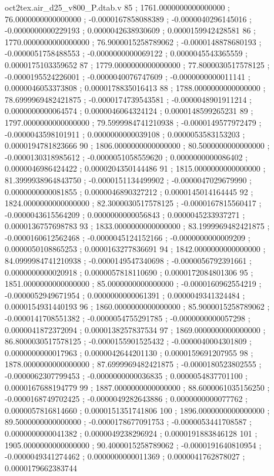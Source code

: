 \begin{filecontents}[overwrite]{oct2tex.air_d25_v800_P.dtab.v}
85 ; 1761.0000000000000000 ; 76.0000000000000000 ; -0.0000167858088389 ; -0.0000040296145016 ; -0.0000000000229193 ; 0.0000042638930609 ; 0.0000159942428581
86 ; 1770.0000000000000000 ; 76.9000015258789062 ; -0.0000148878680193 ; -0.0000051758488553 ; -0.0000000000069122 ; 0.0000045543365559 ; 0.0000175103359652
87 ; 1779.0000000000000000 ; 77.8000030517578125 ; -0.0000195524226001 ; -0.0000040076747609 ; -0.0000000000011141 ; 0.0000046053373808 ; 0.0000178835016413
88 ; 1788.0000000000000000 ; 78.6999969482421875 ; -0.0000174739543581 ; -0.0000048901911214 ; 0.0000000000064574 ; 0.0000046064324124 ; 0.0000148599265231
89 ; 1797.0000000000000000 ; 79.5999984741210938 ; -0.0000149577972479 ; -0.0000043598101911 ; 0.0000000000039108 ; 0.0000053583153203 ; 0.0000194781823666
90 ; 1806.0000000000000000 ; 80.5000000000000000 ; -0.0000130318985612 ; -0.0000051058559620 ; 0.0000000000086402 ; 0.0000046986424422 ; 0.0000204350144486
91 ; 1815.0000000000000000 ; 81.3999938964843750 ; -0.0000151134499902 ; -0.0000047029679990 ; 0.0000000000081855 ; 0.0000046890327212 ; 0.0000145014164445
92 ; 1824.0000000000000000 ; 82.3000030517578125 ; -0.0000167815560417 ; -0.0000043615564209 ; 0.0000000000056843 ; 0.0000045233937271 ; 0.0000136757698783
93 ; 1833.0000000000000000 ; 83.1999969482421875 ; -0.0000160612562468 ; -0.0000045124152166 ; -0.0000000000009209 ; 0.0000050108865253 ; 0.0000163277836691
94 ; 1842.0000000000000000 ; 84.0999984741210938 ; -0.0000149547340698 ; -0.0000056792391661 ; 0.0000000000020918 ; 0.0000057818110690 ; 0.0000172084801306
95 ; 1851.0000000000000000 ; 85.0000000000000000 ; -0.0000160962554219 ; -0.0000052949671954 ; 0.0000000000061391 ; 0.0000049341324484 ; 0.0000154931440193
96 ; 1860.0000000000000000 ; 85.9000015258789062 ; -0.0000141708551382 ; -0.0000054755291785 ; -0.0000000000057298 ; 0.0000041872372094 ; 0.0000138257837534
97 ; 1869.0000000000000000 ; 86.8000030517578125 ; -0.0000155901525432 ; -0.0000040004301809 ; 0.0000000000017963 ; 0.0000042644201130 ; 0.0000159691207955
98 ; 1878.0000000000000000 ; 87.6999969482421875 ; -0.0000180523802555 ; -0.0000062307799453 ; -0.0000000000036835 ; 0.0000054837701100 ; 0.0000167688194779
99 ; 1887.0000000000000000 ; 88.6000061035156250 ; -0.0000168749702425 ; -0.0000049282643886 ; 0.0000000000077762 ; 0.0000057816814660 ; 0.0000151351741806
100 ; 1896.0000000000000000 ; 89.5000000000000000 ; -0.0000178677091753 ; -0.0000053441708587 ; 0.0000000000041382 ; 0.0000049238296924 ; 0.0000191883846128
101 ; 1905.0000000000000000 ; 90.4000015258789062 ; -0.0000191640810954 ; -0.0000049341274462 ; 0.0000000000011369 ; 0.0000041762878027 ; 0.0000179662383744

\end{filecontents}
